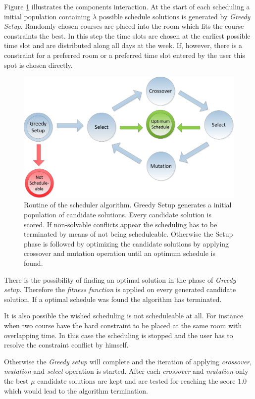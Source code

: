 Figure \ref{fig:scheduler} illustrates the components interaction. At the start of each scheduling a initial population containing $\lambda$ possible schedule solutions is generated by \emph{Greedy Setup}. Randomly chosen courses are placed into the room which fits the course constraints the best. In this step the time slots are chosen at the earliest possible time slot and are distributed along all days at the week. If, however, there is a constraint for a preferred room or a preferred time slot entered by the user this spot is chosen directly.

\begin{figure}[H]
	\centering
		\includegraphics[width=\textwidth]{images/scheduler.png}
	\caption{Routine of the scheduler algorithm. Greedy Setup generates a initial population of candidate solutions. Every candidate solution is scored. If non-solvable conflicts appear the scheduling has to be terminated by means of not being scheduleable. Otherwise the Setup phase is followed by optimizing the candidate solutions by applying crossover and mutation operation until an optimum schedule is found.}
	\label{fig:scheduler}
\end{figure}

There is the possibility of finding an optimal solution in the phase of \emph{Greedy setup}. Therefore the \emph{fitness function} is applied on every generated candidate solution. If a optimal schedule was found the algorithm has terminated.


It is also possible the wished scheduling is not scheduleable at all. For instance when two course have the hard constraint to be placed at the same room with overlapping time. In this case the scheduling is stopped and the user has to resolve the constraint conflict by himself.

Otherwise the \emph{Greedy setup} will complete and the iteration of applying \emph{crossover}, \emph{mutation} and \emph{select} operation is started.  After each \emph{crossover} and \emph{mutation} only the best $\mu$ candidate solutions are kept and are tested for reaching the score $1.0$ which would lead to the algorithm termination.

